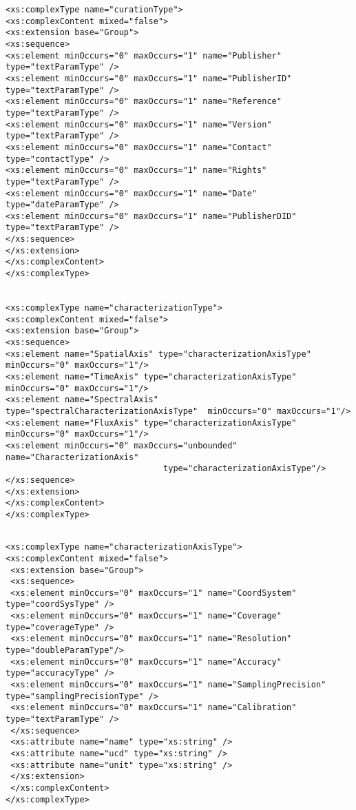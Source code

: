 {\begin{flushleft}
\begin{fmppage}
\begin{verbatim}
<xs:complexType name="curationType">
<xs:complexContent mixed="false">
<xs:extension base="Group">
<xs:sequence>
<xs:element minOccurs="0" maxOccurs="1" name="Publisher" type="textParamType" />
<xs:element minOccurs="0" maxOccurs="1" name="PublisherID" type="textParamType" />
<xs:element minOccurs="0" maxOccurs="1" name="Reference" type="textParamType" />
<xs:element minOccurs="0" maxOccurs="1" name="Version" type="textParamType" />
<xs:element minOccurs="0" maxOccurs="1" name="Contact" type="contactType" />
<xs:element minOccurs="0" maxOccurs="1" name="Rights" type="textParamType" />
<xs:element minOccurs="0" maxOccurs="1" name="Date" type="dateParamType" />
<xs:element minOccurs="0" maxOccurs="1" name="PublisherDID" type="textParamType" />
</xs:sequence>
</xs:extension>
</xs:complexContent>
</xs:complexType>


<xs:complexType name="characterizationType">
<xs:complexContent mixed="false">
<xs:extension base="Group">
<xs:sequence>
<xs:element name="SpatialAxis" type="characterizationAxisType" minOccurs="0" maxOccurs="1"/>
<xs:element name="TimeAxis" type="characterizationAxisType"  minOccurs="0" maxOccurs="1"/>
<xs:element name="SpectralAxis" type="spectralCharacterizationAxisType"  minOccurs="0" maxOccurs="1"/>
<xs:element name="FluxAxis" type="characterizationAxisType"  minOccurs="0" maxOccurs="1"/>
<xs:element minOccurs="0" maxOccurs="unbounded" name="CharacterizationAxis"
                                type="characterizationAxisType"/>
</xs:sequence>
</xs:extension>
</xs:complexContent>
</xs:complexType>

\end{verbatim}
\end{fmppage}

\begin{fmppage}
\begin{verbatim}

<xs:complexType name="characterizationAxisType">
<xs:complexContent mixed="false">
 <xs:extension base="Group">
 <xs:sequence>
 <xs:element minOccurs="0" maxOccurs="1" name="CoordSystem" type="coordSysType" /> 
 <xs:element minOccurs="0" maxOccurs="1" name="Coverage" type="coverageType" />
 <xs:element minOccurs="0" maxOccurs="1" name="Resolution" type="doubleParamType"/>
 <xs:element minOccurs="0" maxOccurs="1" name="Accuracy" type="accuracyType" />
 <xs:element minOccurs="0" maxOccurs="1" name="SamplingPrecision" type="samplingPrecisionType" /> 
 <xs:element minOccurs="0" maxOccurs="1" name="Calibration" type="textParamType" />
 </xs:sequence>
 <xs:attribute name="name" type="xs:string" />
 <xs:attribute name="ucd" type="xs:string" />
 <xs:attribute name="unit" type="xs:string" />   
 </xs:extension>
 </xs:complexContent>
</xs:complexType>




\end{verbatim}
\end{fmppage}
\end{flushleft}}
